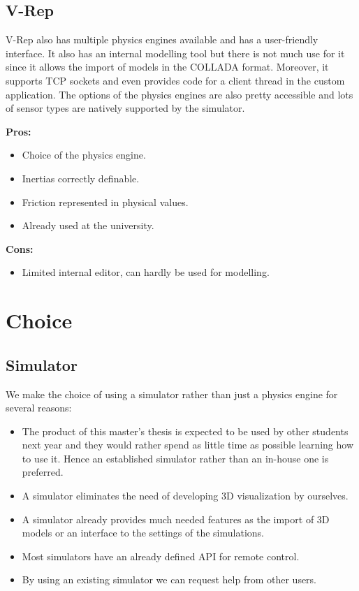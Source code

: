 \subsection{V-Rep}
V-Rep also has multiple physics engines available and has a user-friendly interface. It also has an internal modelling tool but there is not much use for it since it allows the import of models in the COLLADA format. Moreover, it supports TCP sockets and even provides code for a client thread in the custom application. The options of the physics engines are also pretty accessible and lots of sensor types are natively supported by the simulator.

\textbf{Pros:}
\begin{itemize}
\item Choice of the physics engine.
\item Inertias correctly definable.
\item Friction represented in physical values.
\item Already used at the university.
\end{itemize}

\textbf{Cons:}
\begin{itemize}
\item Limited internal editor, can hardly be used for modelling.
\end{itemize}

\section{Choice}
\subsection{Simulator}
We make the choice of using a simulator rather than just a physics engine for several reasons:\begin{itemize}
\item The product of this master's thesis is expected to be used by other students next year and they would rather spend as little time as possible learning how to use it. Hence an established simulator rather than an in-house one is preferred.
\item A simulator eliminates the need of developing 3D visualization by ourselves.
\item A simulator already provides much needed features as the import of 3D models or an interface to the settings of the simulations.
\item Most simulators have an already defined API for remote control.
\item By using an existing simulator we can request help from other users.
\end{itemize}

